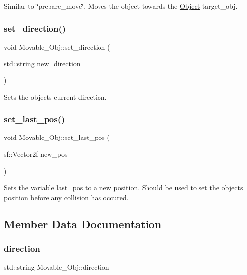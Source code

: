 Similar to \char`\"{}prepare\+\_\+move\char`\"{}. Moves the object towards the \hyperlink{classObject}{Object} target\+\_\+obj. \mbox{\label{classMovable__Obj_a06a8004daec88c5a8d9cc4a3fc1a3561}} 
\subsubsection{\texorpdfstring{set\+\_\+direction()}{set\_direction()}}
{\footnotesize\ttfamily void Movable\+\_\+\+Obj\+::set\+\_\+direction (\begin{DoxyParamCaption}\item[{std\+::string}]{new\+\_\+direction }\end{DoxyParamCaption})}

Sets the objects current direction. \mbox{\label{classMovable__Obj_a4dc4a9c75291956d30705e3b29da7cfc}} 
\subsubsection{\texorpdfstring{set\+\_\+last\+\_\+pos()}{set\_last\_pos()}}
{\footnotesize\ttfamily void Movable\+\_\+\+Obj\+::set\+\_\+last\+\_\+pos (\begin{DoxyParamCaption}\item[{sf\+::\+Vector2f}]{new\+\_\+pos }\end{DoxyParamCaption})}

Sets the variable last\+\_\+pos to a new position. Should be used to set the objects position before any collision has occured. 

\subsection{Member Data Documentation}
\mbox{\label{classMovable__Obj_a4f4eb3171656831c1f0b8dbab2b2a00c}} 
\subsubsection{\texorpdfstring{direction}{direction}}
{\footnotesize\ttfamily std\+::string Movable\+\_\+\+Obj\+::direction\hspace{0.3cm}{\ttfamily [protected]}}

